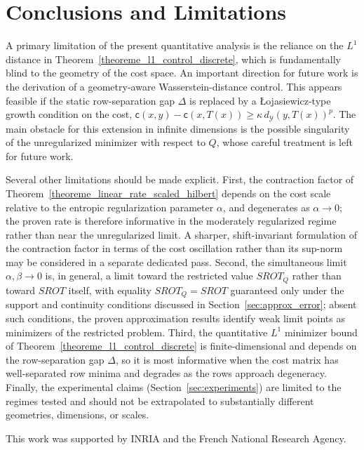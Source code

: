 \documentclass{article}
\begin{document}
\section{Conclusions and Limitations}
\label{sec:conclusion}
A primary limitation of the present quantitative analysis is the reliance on the $L^1$ distance in Theorem~\ref{theoreme_l1_control_discrete}, which is fundamentally blind to the geometry of the cost space. An important direction for future work is the derivation of a geometry-aware Wasserstein-distance control. This appears feasible if the static row-separation gap $\Delta$ is replaced by a Łojasiewicz-type growth condition on the cost, $\mathsf{c}(x,y) - \mathsf{c}(x,T(x)) \geq \kappa\, d_{\mathcal{Y}}(y,T(x))^p$. The main obstacle for this extension in infinite dimensions is the possible singularity of the unregularized minimizer with respect to $Q$, whose careful treatment is left for future work.

Several other limitations should be made explicit. First, the contraction factor of Theorem~\ref{theoreme_linear_rate_scaled_hilbert} depends on the cost scale relative to the entropic regularization parameter $\alpha$, and degenerates as $\alpha \to 0$; the proven rate is therefore informative in the moderately regularized regime rather than near the unregularized limit. A sharper, shift-invariant formulation of the contraction factor in terms of the cost oscillation rather than its sup-norm may be considered in a separate dedicated pass. Second, the simultaneous limit $\alpha,\beta \to 0$ is, in general, a limit toward the restricted value $SROT_Q$ rather than toward $SROT$ itself, with equality $SROT_Q = SROT$ guaranteed only under the support and continuity conditions discussed in Section~\ref{sec:approx_error}; absent such conditions, the proven approximation results identify weak limit points as minimizers of the restricted problem. Third, the quantitative $L^1$ minimizer bound of Theorem~\ref{theoreme_l1_control_discrete} is finite-dimensional and depends on the row-separation gap $\Delta$, so it is most informative when the cost matrix has well-separated row minima and degrades as the rows approach degeneracy. Finally, the experimental claims (Section~\ref{sec:experiments}) are limited to the regimes tested and should not be extrapolated to substantially different geometries, dimensions, or scales.

\begin{ack}
  This work was supported by INRIA and the French National Research Agency.
\end{ack}
\end{document}
